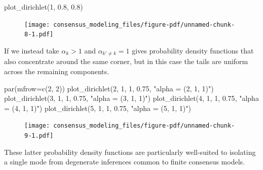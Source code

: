 \documentclass[
  letterpaper,
  DIV=11,
  numbers=noendperiod]{scrartcl}
\newenvironment{Shaded}{\begin{snugshade}}{\end{snugshade}}
\newcommand{\AttributeTok}[1]{\textcolor[rgb]{0.40,0.45,0.13}{#1}}
\newcommand{\DecValTok}[1]{\textcolor[rgb]{0.68,0.00,0.00}{#1}}
\newcommand{\FloatTok}[1]{\textcolor[rgb]{0.68,0.00,0.00}{#1}}
\newcommand{\FunctionTok}[1]{\textcolor[rgb]{0.28,0.35,0.67}{#1}}
\newcommand{\NormalTok}[1]{\textcolor[rgb]{0.00,0.23,0.31}{#1}}
\newcommand{\StringTok}[1]{\textcolor[rgb]{0.13,0.47,0.30}{#1}}
\begin{document}
\begin{Shaded}
\begin{Highlighting}[]
\FunctionTok{plot\_dirichlet}\NormalTok{(}\DecValTok{1}\NormalTok{, }\FloatTok{0.8}\NormalTok{, }\FloatTok{0.8}\NormalTok{)}
\end{Highlighting}
\end{Shaded}

\begin{figure}[H]

{\centering \texttt{[image: consensus\_modeling\_files/figure-pdf/unnamed-chunk-8-1.pdf]}

}

\end{figure}

If we instead take \(\alpha_{k} > 1\) and \(\alpha_{k' \ne k} = 1\)
gives probability density functions that also concentrate around the
same corner, but in this case the tails are uniform across the remaining
components.

\begin{Shaded}
\begin{Highlighting}[]
\FunctionTok{par}\NormalTok{(}\AttributeTok{mfrow=}\FunctionTok{c}\NormalTok{(}\DecValTok{2}\NormalTok{, }\DecValTok{2}\NormalTok{))}
\FunctionTok{plot\_dirichlet}\NormalTok{(}\DecValTok{2}\NormalTok{, }\DecValTok{1}\NormalTok{, }\DecValTok{1}\NormalTok{, }\FloatTok{0.75}\NormalTok{, }\StringTok{"alpha = (2, 1, 1)"}\NormalTok{)}
\FunctionTok{plot\_dirichlet}\NormalTok{(}\DecValTok{3}\NormalTok{, }\DecValTok{1}\NormalTok{, }\DecValTok{1}\NormalTok{, }\FloatTok{0.75}\NormalTok{, }\StringTok{"alpha = (3, 1, 1)"}\NormalTok{)}
\FunctionTok{plot\_dirichlet}\NormalTok{(}\DecValTok{4}\NormalTok{, }\DecValTok{1}\NormalTok{, }\DecValTok{1}\NormalTok{, }\FloatTok{0.75}\NormalTok{, }\StringTok{"alpha = (4, 1, 1)"}\NormalTok{)}
\FunctionTok{plot\_dirichlet}\NormalTok{(}\DecValTok{5}\NormalTok{, }\DecValTok{1}\NormalTok{, }\DecValTok{1}\NormalTok{, }\FloatTok{0.75}\NormalTok{, }\StringTok{"alpha = (5, 1, 1)"}\NormalTok{)}
\end{Highlighting}
\end{Shaded}

\begin{figure}[H]

{\centering \texttt{[image: consensus\_modeling\_files/figure-pdf/unnamed-chunk-9-1.pdf]}

}

\end{figure}

These latter probability density functions are particularly well-suited
to isolating a single mode from degenerate inferences common to finite
consensus models.
\end{document}
